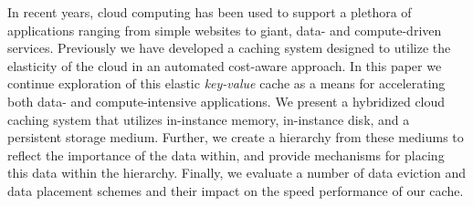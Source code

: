 In recent years, cloud computing has been used to support a plethora of
applications ranging from simple websites to giant, data- and compute-driven
services. Previously we have developed a caching system designed to utilize the
elasticity of the cloud in an automated cost-aware approach. In this paper we
continue exploration of this elastic \emph{key-value} cache as a means for
accelerating both data- and compute-intensive applications. We present a
hybridized cloud caching system that utilizes in-instance memory, in-instance
disk, and a persistent storage medium. Further, we create a hierarchy from
these mediums to reflect the importance of the data within, and provide
mechanisms for placing this data within the hierarchy. Finally, we evaluate a
number of data eviction and data placement schemes and their impact on the
speed performance of our cache.
